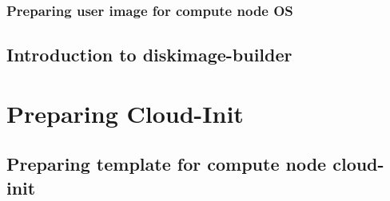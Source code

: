 \documentclass[letterpaper]{article}
\newcommand{\baseOS}{CentOS7.3}
\begin{document}
\subsubsection{Preparing user image for compute node OS}\label{sec:compute_node_images}


\subsection{Introduction to diskimage-builder}\label{sec:din_intro}


\clearpage

\section{Preparing Cloud-Init} \label{sec:cloud-init_prep}



\subsection{Preparing template for compute node cloud-init} \label{sec:c_i-template_compute_node}


\end{document}
